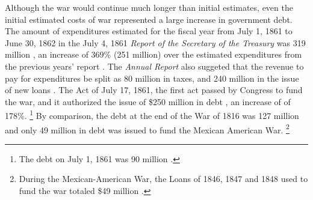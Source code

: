 \documentclass[11pt, oneside, article]{memoir}\usepackage[]{graphicx}\usepackage[]{color}
\begin{document}
Although the war would continue much longer than initial estimates, even the initial estimated costs of war represented a large increase in government debt.
The amount of expenditures estimated for the fiscal year from July 1, 1861 to June 30, 1862 in the July 4, 1861 \textit{Report of the Secretary of the Treasury} was 319 million \parencite[5]{Treasury1861a}, an increase of 369\% (251 million) over the estimated expenditures from the previous years' report \parencite[6]{Treasury1860}.
The \textit{Annual Report} also suggeted that the revenue to pay for expenditures be split as 80 million in taxes, and 240 million in the issue of new loans  \parencite[6]{Treasury1861a}.
The Act of July 17, 1861, the first act passed by Congress to fund the war, and it authorized the issue of \$250 million in debt \parencite[44]{Treasury1863}, an increase of of 178\%.%
\footnote{The debt on July 1, 1861 was 90 million \parencite[23]{Treasury1861a}.}
By comparison, the debt at the end of the War of 1816 was 127 million \parencite[29]{Elder1863} and only 49 million in debt was issued to fund the Mexican American War.%
\footnote{During the Mexican-American War, the Loans of 1846, 1847 and 1848 used to fund the war totaled \$49 million \parencite[42]{Treasury1863}.}
\end{document}
